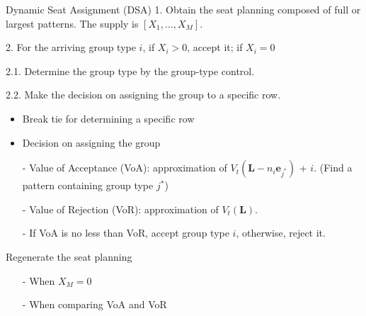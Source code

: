   

  
  

    


    \begin{frame}{Dynamic Seat Assignment (DSA)}
      1. Obtain the seat planning composed of full or largest patterns. The supply is $[X_1, \ldots, X_M]$.

      2. For the arriving group type $i$, if $X_i > 0$, accept it; if $X_i = 0$
      
      2.1. Determine the group type by the group-type control.

      2.2. Make the decision on assigning the group to a specific row.
      \begin{itemize}
        \item Break tie for determining a specific row
        \item Decision on assigning the group
        \item[-] Value of Acceptance (VoA): approximation of $V_{t} (\mathbf{L}-n_i \mathbf{e}_{j^{*}})$ + $i$. (Find a pattern containing group type $j^{*}$)
        
        \item[-] Value of Rejection (VoR): approximation of $V_{t} (\mathbf{L})$.

        \item[-] If VoA is no less than VoR, accept group type $i$, otherwise, reject it.
      \end{itemize}
      Regenerate the seat planning
      \begin{itemize}
      \item[-] When $X_{M} =0$
      \item[-] When comparing VoA and VoR 
      \end{itemize}
    \end{frame}

